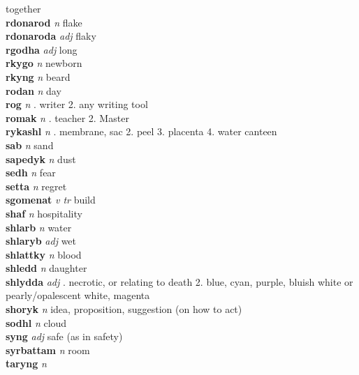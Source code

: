 together\\\textbf{rdonarod}   \emph{n} \textperiodcentered flake\\\textbf{rdonaroda}   \emph{adj} \textperiodcentered flaky\\\textbf{rgodha}   \emph{adj} \textperiodcentered long\\\textbf{rkygo}   \emph{n} \textperiodcentered newborn\\\textbf{rkyng}   \emph{n} \textperiodcentered beard\\\textbf{rodan}   \emph{n} \textperiodcentered day\\\textbf{rog}   \emph{n} . writer 2. any writing tool \\\textbf{romak}   \emph{n} . teacher 2. Master \\\textbf{rykashl}   \emph{n} . membrane, sac 2. peel 3. placenta 4. water canteen \\\textbf{sab}   \emph{n} \textperiodcentered sand\\\textbf{sapedyk}   \emph{n} \textperiodcentered dust\\\textbf{sedh}   \emph{n} \textperiodcentered fear\\\textbf{setta}   \emph{n} \textperiodcentered regret\\\textbf{sgomenat}   \emph{v tr} \textperiodcentered build\\\textbf{shaf}   \emph{n} \textperiodcentered hospitality\\\textbf{shlarb}   \emph{n} \textperiodcentered water\\\textbf{shlaryb}   \emph{adj} \textperiodcentered wet\\\textbf{shlattky}   \emph{n} \textperiodcentered blood\\\textbf{shledd}   \emph{n} \textperiodcentered daughter\\\textbf{shlydda}   \emph{adj} . necrotic, or relating to death 2. blue, cyan, purple, bluish white or pearly/opalescent white, magenta \\\textbf{shoryk}   \emph{n} \textperiodcentered idea, proposition, suggestion (on how to act)\\\textbf{sodhl}   \emph{n} \textperiodcentered cloud\\\textbf{syng}   \emph{adj} \textperiodcentered safe (as in safety)\\\textbf{syrbattam}   \emph{n} \textperiodcentered room\\\textbf{taryng}   \emph{n} \textperiodcentered 
